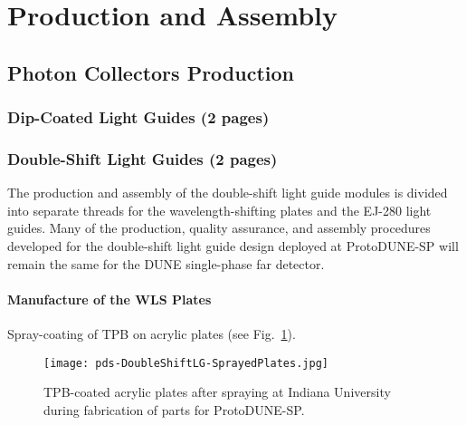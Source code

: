 \section{Production and Assembly}
\label{sec:fdsp-pd-prod-assy}

\subsection{Photon Collectors Production}
\label{sec:fdsp-pd-prod-pc}
	
\subsubsection{Dip-Coated Light Guides (2 pages)}
\label{ssec:fdsp-pd-pc-prod-bar1}

\subsubsection{Double-Shift Light Guides (2 pages)}
\label{ssec:fdsp-pd-pc-prod-bar2}

The production and assembly of the double-shift light guide modules is divided 
into separate threads for the wavelength-shifting plates and the EJ-280 light guides. 
Many of the production, quality assurance, and assembly procedures developed for the
 double-shift light guide design deployed at ProtoDUNE-SP will remain the same for 
the DUNE single-phase far detector.

\paragraph*{Manufacture of the WLS Plates}

Spray-coating of TPB on acrylic plates (see Fig.~\ref{fig:DoubleShiftLG-SprayedPlates}).

\begin{figure}[ht]
  \begin{center}
  \texttt{[image: pds-DoubleShiftLG-SprayedPlates.jpg]}
  \caption{TPB-coated acrylic plates after spraying at Indiana University 
during fabrication of parts for ProtoDUNE-SP.}\label{fig:DoubleShiftLG-SprayedPlates}
  \end{center}
\end{figure}

